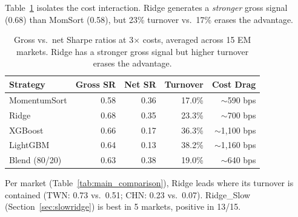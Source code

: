 \documentclass[sigconf,balance=false]{acmart}
\begin{document}
Table~\ref{tab:gross_vs_net} isolates the cost interaction. Ridge
generates a \emph{stronger} gross signal (0.68) than MomSort (0.58),
but 23\% turnover vs.\ 17\% erases the advantage.

\begin{table}[t]
\centering
\caption{Gross vs.\ net Sharpe ratios at 3$\times$ costs, averaged
across 15 EM markets. Ridge has a stronger gross signal but higher
turnover erases the advantage.}
\label{tab:gross_vs_net}
\small
\begin{tabular}{@{}lrrrr@{}}
\toprule
Strategy & Gross SR & Net SR & Turnover & Cost Drag \\
\midrule
MomentumSort  & 0.58 &  0.36  & 17.0\% & $\sim$590 bps \\
Ridge         & 0.68 &  0.35  & 23.3\% & $\sim$700 bps \\
XGBoost       & 0.66 &  0.17  & 36.3\% & $\sim$1{,}100 bps \\
LightGBM      & 0.64 &  0.13  & 38.2\% & $\sim$1{,}160 bps \\
Blend (80/20) & 0.63 &  0.38  & 19.0\% & $\sim$640 bps \\
\bottomrule
\end{tabular}
\end{table}


Per market (Table~\ref{tab:main_comparison}), Ridge leads where its
turnover is contained (TWN: 0.73 vs.\ 0.51; CHN: 0.23 vs.\ 0.07). Ridge\_Slow
(Section~\ref{sec:slowridge}) is best in 5 markets, positive in 13/15.
\end{document}
